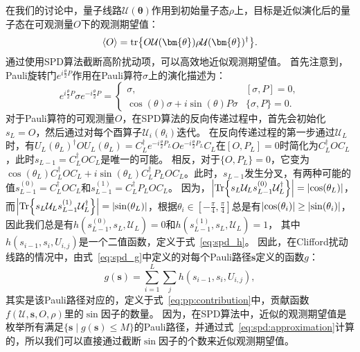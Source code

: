 在我们的讨论中，量子线路$\mathcal{U}(\bm{\theta})$作用到初始量子态$\rho$上，目标是近似演化后的量子态在可观测量$O$下的观测期望值：
\begin{equation}
    \langle O \rangle = \tr{O \mathcal{U}(\bm{\theta})\rho \mathcal{U}(\bm{\theta})^\dagger}.
\end{equation}
通过使用SPD算法截断高阶扰动项，可以高效地近似观测期望值。
首先注意到，Pauli旋转门$e^{i\frac{\theta}{2} P}$作用在Pauli算符$\sigma$上的演化描述为：
\begin{equation}\label{eq:heisenberg}
  e^{i \frac{\theta}{2} P} \sigma e^{-i \frac{\theta}{2} P} = 
  \begin{cases}
  \sigma, & [\sigma,P] = 0, \\
  \cos(\theta) \sigma + i \sin(\theta) P\sigma & \{\sigma, P\} = 0.
  \end{cases} 
\end{equation}
对于Pauli算符的可观测量$O$，在SPD算法的反向传递过程中，首先会初始化$s_L=O$，然后通过对每个酉算子$\mathcal{U}_i(\theta_i)$迭代。
在反向传递过程的第一步通过$\mathcal{U}_L$时，有${U}_L(\theta_L)^{\dagger} O {U}_L(\theta_L)=C^\dagger_Le^{-i\frac{\theta}{2} P_L}Oe^{-i\frac{\theta}{2} P_L}C_L$在$[O,P_L]=0$时简化为$C_L^\dagger O C_L$，此时$s_{L-1}=C_L^\dagger O C_L$是唯一的可能。
相反，对于$\{O,P_L\} = 0$，它变为$\cos(\theta_L)C_L^\dagger O C_L + i\sin(\theta_L) C_L^\dagger P_L O C_L$。此时，$s_{L-1}$发生分叉，有两种可能的值$s_{L-1}^{(0)}=C_L^\dagger O C_L$和$s_{L-1}^{(1)}=C_L^\dagger P_L O C_L$。
因为，$\abs{\Tr{s_L \mathcal{U}_{L} s_{L-1}^{(0)} \mathcal{U}_{L}^\dagger}}=\abs{\cos(\theta_L)}$，而$\abs{\Tr{s_L \mathcal{U}_{L} s_{L-1}^{(1)} \mathcal{U}_{L}^\dagger}}=\abs{\sin(\theta_L)}$，根据$\theta_i\in [-\frac{\pi}{4},\frac{\pi}{4}]$总是有$\abs{\cos(\theta_i)}\geq \abs{\sin(\theta_i)}$，因此我们总是有$h(s_{L-1}^{(0)},s_L,\mathcal{U}_{L})=0$和$h(s_{L-1}^{(1)},s_L,\mathcal{U}_{L})=1$，
其中$h(s_{i-1},s_i,U_{i,j})$是一个二值函数，定义于式~\eqref{eq:spd_h}。
因此，在Clifford扰动线路的情况中，由式~\eqref{eq:spd_g}中定义的对每个Pauli路径$\bm{s}$定义的函数$g$：
\begin{equation}
    g(\bm{s})=\sum_{i=1}^{L}\sum_{j} h(s_{i-1},s_i,U_{i,j}),
\end{equation}
其实是该Pauli路径对应的，定义于式~\eqref{eq:pp:contribution}中，贡献函数$f(\mathcal{U},\bm{s},O,\rho)$里的$\sin$因子的数量。
因为，在SPD算法中，近似的观测期望值是枚举所有满足$\{\bm{s}\mid g(\bm{s})\leq M\}$的Pauli路径，并通过式~\eqref{eq:spd:approximation}计算的，所以我们可以直接通过截断$\sin$因子的个数来近似观测期望值。

